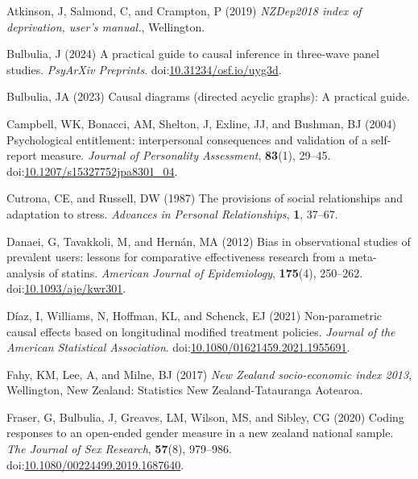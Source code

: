 \documentclass[
  singlecolumn]{article}
\newlength{\cslhangindent}
\newenvironment{CSLReferences}[2] %
 {\begin{list}{}{%
  \setlength{\itemindent}{0pt}
  \setlength{\leftmargin}{0pt}
  \setlength{\parsep}{0pt}
  \ifodd #1
   \setlength{\leftmargin}{\cslhangindent}
   \setlength{\itemindent}{-1\cslhangindent}
  \fi
  \setlength{\itemsep}{#2\baselineskip}}}
 {\end{list}}
\begin{document}
\label{refs}
\begin{CSLReferences}{1}{0}
Atkinson, J, Salmond, C, and Crampton, P (2019) \emph{NZDep2018 index of
deprivation, user{'}s manual.}, Wellington.

Bulbulia, J (2024) A practical guide to causal inference in three-wave
panel studies. \emph{PsyArXiv Preprints}.
doi:\href{https://doi.org/10.31234/osf.io/uyg3d}{10.31234/osf.io/uyg3d}.

Bulbulia, JA (2023) Causal diagrams (directed acyclic graphs): A
practical guide.

Campbell, WK, Bonacci, AM, Shelton, J, Exline, JJ, and Bushman, BJ
(2004) Psychological entitlement: interpersonal consequences and
validation of a self-report measure. \emph{Journal of Personality
Assessment}, \textbf{83}(1), 29--45.
doi:\href{https://doi.org/10.1207/s15327752jpa8301_04}{10.1207/s15327752jpa8301\_04}.

Cutrona, CE, and Russell, DW (1987) The provisions of social
relationships and adaptation to stress. \emph{Advances in Personal
Relationships}, \textbf{1}, 37--67.

Danaei, G, Tavakkoli, M, and Hernán, MA (2012) Bias in observational
studies of prevalent users: lessons for comparative effectiveness
research from a meta-analysis of statins. \emph{American Journal of
Epidemiology}, \textbf{175}(4), 250--262.
doi:\href{https://doi.org/10.1093/aje/kwr301}{10.1093/aje/kwr301}.

Díaz, I, Williams, N, Hoffman, KL, and Schenck, EJ (2021) Non-parametric
causal effects based on longitudinal modified treatment policies.
\emph{Journal of the American Statistical Association}.
doi:\href{https://doi.org/10.1080/01621459.2021.1955691}{10.1080/01621459.2021.1955691}.

Fahy, KM, Lee, A, and Milne, BJ (2017) \emph{New Zealand socio-economic
index 2013}, Wellington, New Zealand: Statistics New Zealand-Tatauranga
Aotearoa.

Fraser, G, Bulbulia, J, Greaves, LM, Wilson, MS, and Sibley, CG (2020)
Coding responses to an open-ended gender measure in a new zealand
national sample. \emph{The Journal of Sex Research}, \textbf{57}(8),
979--986.
doi:\href{https://doi.org/10.1080/00224499.2019.1687640}{10.1080/00224499.2019.1687640}.


\end{CSLReferences}
\end{document}
